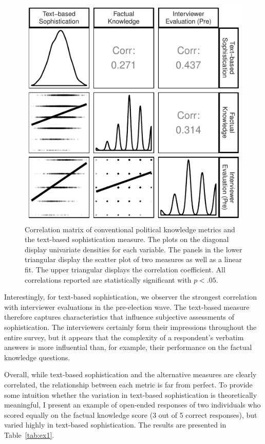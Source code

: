 \documentclass[12pt]{article}
\begin{document}
\begin{figure}[h]\centering
\includegraphics{../fig/corplot_pres.pdf}
\caption{Correlation matrix of conventional political knowledge metrics and the text-based sophistication measure. The plots on the diagonal display univariate densities for each variable. The panels in the lower triangular display the scatter plot of two measures as well as a linear fit. The upper triangular displays the correlation coefficient. All correlations reported are statistically significant with $p<.05$.}\label{fig:corplot}
\end{figure}

Interestingly, for text-based sophistication, we observer the strongest correlation with interviewer evaluations in the pre-election wave. The text-based measure therefore captures characteristics that influence subjective assessments of sophistication. The interviewers certainly form their impressions throughout the entire survey, but it appears that the complexity of a respondent's verbatim answers is more influential than, for example, their performance on the factual knowledge questions.

Overall, while text-based sophistication and the alternative measures are clearly correlated, the relationship between each metric is far from perfect. To provide some intuition whether the variation in text-based sophistication is theoretically meaningful, I present an example of open-ended responses of two individuals who scored equally on the factual knowledge score (3 out of 5 correct responses), but varied highly in text-based sophistication. The results are presented in Table~\ref{tab:ex1}.
\end{document}
